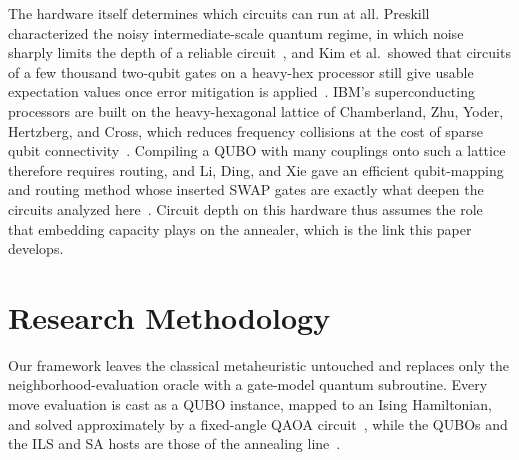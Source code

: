 \documentclass{svproc}
\newcommand{\rev}[1]{{\color{blue}#1}}
\newcommand{\rev}[1]{#1}
\begin{document}
The hardware itself determines which circuits can run at all. Preskill
characterized the noisy intermediate-scale quantum regime, in which noise
sharply limits the depth of a reliable circuit~\cite{preskill2018}\rev{, and
Kim et al.\ showed that circuits of a few thousand two-qubit gates on a
heavy-hex processor still give usable expectation values once error
mitigation is applied~\cite{kim2023}}. IBM's
superconducting processors are built on the heavy-hexagonal lattice of
Chamberland, Zhu, Yoder, Hertzberg, and Cross, which reduces frequency
collisions at the cost of sparse qubit connectivity~\cite{chamberland2020}.
Compiling a QUBO with many couplings onto such a lattice therefore
requires routing, and Li, Ding, and Xie gave an efficient qubit-mapping
and routing method whose inserted SWAP gates are exactly what deepen the
circuits analyzed here~\cite{li2019}. Circuit depth on this hardware thus
assumes the role that embedding capacity plays on the annealer, which is
the link this paper develops.

\section{Research Methodology}
\label{sec:method}

Our framework leaves the classical metaheuristic untouched and replaces
only the neighborhood-evaluation oracle with a gate-model quantum
subroutine. Every move evaluation is cast as a QUBO instance, mapped to
an Ising Hamiltonian, and solved approximately by a fixed-angle QAOA
circuit~\cite{farhi2014qaoa}\rev{, while the QUBOs and the ILS and SA hosts are
those of the annealing line~\cite{wojewodzki2026soco,wojewodzki2026windowed}}.
\end{document}
